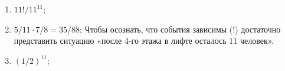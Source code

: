 \documentclass[12pt]{article}
\begin{document}
\begin{enumerate}
    \begin{enumerate}
        \item $11! / 11^11$;
        \item $5/11 \cdot 7/8 = 35/88$; Чтобы осознать, что события зависимы (!) достаточно представить ситуацию «после 4-го этажа в лифте осталось 11 человек».
        \item $(1/2)^{11}$;
    \end{enumerate}
\end{enumerate}
\end{document}
